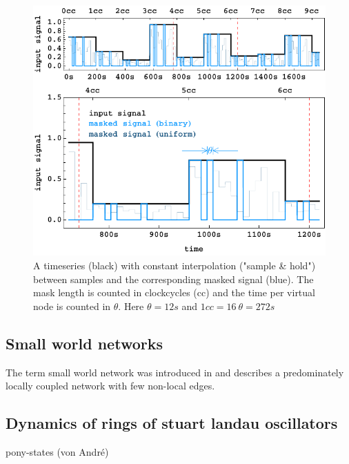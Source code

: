 \begin{figure}
	\centering
	\includegraphics[width=0.99\linewidth]{pics/signal_mask_vis}
	\caption{A timeseries (black) with constant interpolation ("sample \& hold") between samples and the corresponding masked signal (blue). The mask length is counted in clockcycles (cc) and the time per virtual node is counted in $\theta$. Here $\theta = 12s$ and $1cc = 16 \ \theta = 272 s $}
	\label{fig:signal_mask_vis}
\end{figure}

\subsection{Small world networks}
	The term small world network was introduced in \cite{WAT98a} and describes a predominately locally coupled network with few non-local edges. 
	

\subsection{Dynamics of rings of stuart landau oscillators}
	pony-states (von André)
	
	


